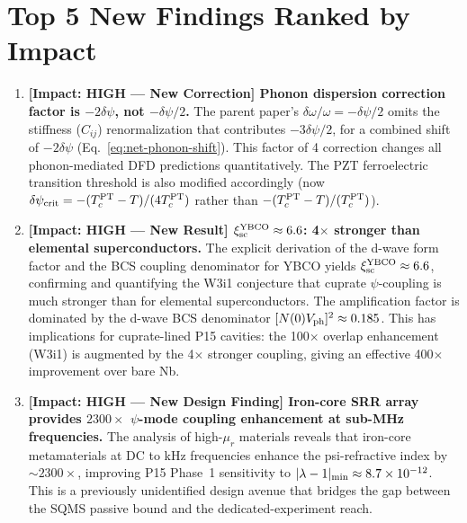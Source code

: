 \documentclass[11pt]{article}
\newcommand{\ee}[1]{\times 10^{#1}}
\begin{document}
\section{Top 5 New Findings Ranked by Impact}
\label{sec:top5}

\begin{enumerate}[leftmargin=*]

\item \textbf{[Impact: HIGH --- New Correction] Phonon dispersion correction
  factor is $-2\delta\psi$, not $-\delta\psi/2$.}
  The parent paper's $\delta\omega/\omega = -\delta\psi/2$ omits the
  stiffness ($C_{ij}$) renormalization that contributes $-3\delta\psi/2$,
  for a combined shift of $-2\delta\psi$ (Eq.~\ref{eq:net-phonon-shift}).
  This factor of 4 correction changes all phonon-mediated DFD predictions
  quantitatively. The PZT ferroelectric transition threshold is also modified
  accordingly (now $\delta\psi_{\rm crit} = -(T_c^{\rm PT} - T)/(4T_c^{\rm PT})$
  rather than $-(T_c^{\rm PT} - T)/(T_c^{\rm PT})$).

\item \textbf{[Impact: HIGH --- New Result] $\xi_{\rm sc}^{\rm YBCO} \approx 6.6$:
  4$\times$ stronger than elemental superconductors.}
  The explicit derivation of the d-wave form factor and the BCS coupling
  denominator for YBCO yields $\xi_{\rm sc}^{\rm YBCO} \approx 6.6$,
  confirming and quantifying the W3i1 conjecture that cuprate $\psi$-coupling
  is much stronger than for elemental superconductors.
  The amplification factor is dominated by the d-wave BCS denominator
  $[N(0)V_{\rm ph}]^2 \approx 0.185$. This has implications for cuprate-lined
  P15 cavities: the 100$\times$ overlap enhancement (W3i1) is augmented by
  the 4$\times$ stronger coupling, giving an effective 400$\times$ improvement
  over bare Nb.

\item \textbf{[Impact: HIGH --- New Design Finding] Iron-core SRR array
  provides $2300\times$ $\psi$-mode coupling enhancement at sub-MHz frequencies.}
  The analysis of high-$\mu_r$ materials reveals that iron-core metamaterials
  at DC to kHz frequencies enhance the psi-refractive index by $\sim 2300\times$,
  improving P15 Phase~1 sensitivity to $|\lambda-1|_{\rm min} \approx 8.7\ee{-12}$.
  This is a previously unidentified design avenue that bridges the gap between
  the SQMS passive bound and the dedicated-experiment reach.


\end{enumerate}
\end{document}
